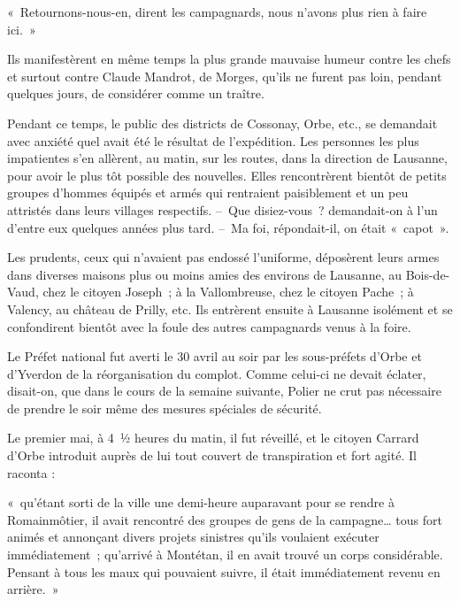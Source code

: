 \documentclass[french,twoside]{book} %
\newenvironment{quoteblock}%
  {\begin{quoting}}
  {\end{quoting}}
\newenvironment{quotebar}{%
    \def\FrameCommand{{\color{rubric!10!}\vrule width 0.5em} \hspace{0.9em}}%
    \def\OuterFrameSep{\itemsep} %
    \MakeFramed {\advance\hsize-\width \FrameRestore}
  }%
  {%
    \endMakeFramed
  }
\renewenvironment{quoteblock}%
  {%
    \savenotes
    \setstretch{0.9}
    \normalfont
    \begin{quotebar}
  }
  {%
    \end{quotebar}
    \spewnotes
  }
\begin{document}
\begin{quoteblock}
\noindent « Retournons-nous-en, dirent les campagnards, nous n’avons plus rien à faire ici. »\end{quoteblock}

\noindent Ils manifestèrent en même temps la plus grande mauvaise humeur contre les chefs et surtout contre Claude Mandrot, de Morges, qu’ils ne furent pas loin, pendant quelques jours, de considérer comme un traître.\par
Pendant ce temps, le public des districts de Cossonay, Orbe, etc., se demandait avec anxiété quel avait été le résultat de l’expédition. Les personnes les plus impatientes s’en allèrent, au matin, sur les routes, dans la direction de Lausanne, pour avoir le plus tôt possible des nouvelles. Elles rencontrèrent bientôt de petits groupes d’hommes équipés et armés qui rentraient paisiblement et un peu attristés dans leurs villages respectifs. – Que disiez-vous ? demandait-on à l’un d’entre eux quelques années plus tard. – Ma foi, répondait-il, on était « capot ».\par
Les prudents, ceux qui n’avaient pas endossé l’uniforme, déposèrent leurs armes dans diverses maisons plus ou moins amies des environs de Lausanne, au Bois-de-Vaud, chez le citoyen Joseph ; à la Vallombreuse, chez le citoyen Pache ; à Valency, au château de Prilly, etc. Ils entrèrent ensuite à Lausanne isolément et se confondirent bientôt avec la foule des autres campagnards venus à la foire.\par
Le Préfet national fut averti le 30 avril au soir par les sous-préfets d’Orbe et d’Yverdon de la réorganisation du complot. Comme celui-ci ne devait éclater, disait-on, que dans le cours de la semaine suivante, Polier ne crut pas nécessaire de prendre le soir même des mesures spéciales de sécurité.\par
Le premier mai, à 4 ½ heures du matin, il fut réveillé, et le citoyen Carrard d’Orbe introduit auprès de lui tout couvert de transpiration et fort agité. Il raconta :\par

\begin{quoteblock}
\noindent « qu’étant sorti de la ville une demi-heure auparavant pour se rendre à Romainmôtier, il avait rencontré des groupes de gens de la campagne… tous fort animés et annonçant divers projets sinistres qu’ils voulaient exécuter immédiatement ; qu’arrivé à Montétan, il en avait trouvé un corps considérable. Pensant à tous les maux qui pouvaient suivre, il était immédiatement revenu en arrière. »\end{quoteblock}
\end{document}
